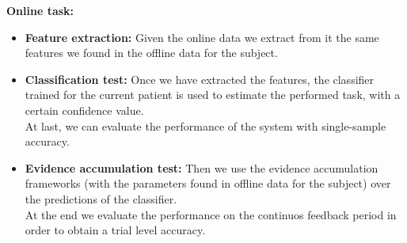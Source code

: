 \noindent
{\Large\textbf{Online task:}}

\begin{itemize}
\item \textbf{Feature extraction:} Given the online data we extract from it the same features we found in the offline data for the subject. 
\item \textbf{Classification test:} Once we have extracted the features, the classifier trained for the current patient is used to estimate the performed task, with a certain confidence value. \\
At last, we can evaluate the performance of the system with single-sample accuracy.
\item \textbf{Evidence accumulation test:} Then we use the evidence accumulation frameworks (with the parameters found in offline data for the subject) over the predictions of the classifier.\\
At the end we evaluate the performance on the continuos feedback period in order to obtain a trial level accuracy.
\end{itemize}